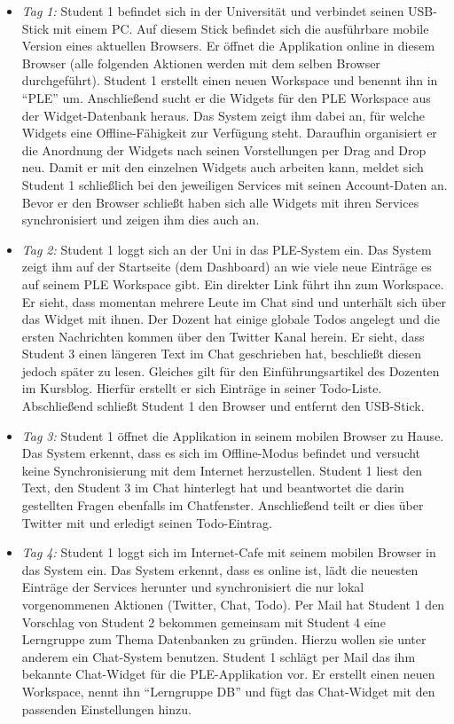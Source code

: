 \begin{itemize}
 \item \emph{Tag 1:} Student 1 befindet sich in der Universität und verbindet seinen USB-Stick mit einem PC. Auf diesem Stick befindet sich die ausführbare mobile Version eines aktuellen Browsers. Er öffnet die Applikation online in diesem Browser (alle folgenden Aktionen werden mit dem selben Browser durchgeführt). Student 1 erstellt einen neuen Workspace und benennt ihn in "`PLE"' um. Anschließend sucht er die Widgets für den PLE Workspace aus der Widget-Datenbank heraus. Das System zeigt ihm dabei an, für welche Widgets eine Offline-Fähigkeit zur Verfügung steht. Daraufhin organisiert er die Anordnung der Widgets nach seinen Vorstellungen per Drag and Drop neu. Damit er mit den einzelnen Widgets auch arbeiten kann, meldet sich Student 1 schließlich bei den jeweiligen Services mit seinen Account-Daten an. Bevor er den Browser schließt haben sich alle Widgets mit ihren Services synchronisiert und zeigen ihm dies auch an.
 \item \emph{Tag 2:} Student 1 loggt sich an der Uni in das PLE-System ein. Das System zeigt ihm auf der Startseite (dem Dashboard) an wie viele neue Einträge es auf seinem PLE Workspace gibt. Ein direkter Link führt ihn zum Workspace. Er sieht, dass momentan mehrere Leute im Chat sind und unterhält sich über das Widget mit ihnen. Der Dozent hat einige globale Todos angelegt und die ersten Nachrichten kommen über den Twitter Kanal herein. Er sieht, dass Student 3 einen längeren Text im Chat geschrieben hat, beschließt diesen jedoch später zu lesen. Gleiches gilt für den Einführungsartikel des Dozenten im Kursblog. Hierfür erstellt er sich Einträge in seiner Todo-Liste. Abschließend schließt Student 1 den Browser und entfernt den USB-Stick.
 \item \emph{Tag 3:} Student 1 öffnet die Applikation in seinem mobilen Browser zu Hause. Das System erkennt, dass es sich im Offline-Modus befindet und versucht keine Synchronisierung mit dem Internet herzustellen. Student 1 liest den Text, den Student 3 im Chat hinterlegt hat und beantwortet die darin gestellten Fragen ebenfalls im Chatfenster. Anschließend teilt er dies über Twitter mit und erledigt seinen Todo-Eintrag.
 \item \emph{Tag 4:} Student 1 loggt sich im Internet-Cafe mit seinem mobilen Browser in das System ein. Das System erkennt, dass es online ist, lädt die neuesten Einträge der Services herunter und synchronisiert die nur lokal vorgenommenen Aktionen (Twitter, Chat, Todo). Per Mail hat Student 1 den Vorschlag von Student 2 bekommen gemeinsam mit Student 4 eine Lerngruppe zum Thema Datenbanken zu gründen. Hierzu wollen sie unter anderem ein Chat-System benutzen. Student 1 schlägt per Mail das ihm bekannte Chat-Widget für die PLE-Applikation vor. Er erstellt einen neuen Workspace, nennt ihn “Lerngruppe DB” und fügt das Chat-Widget mit den passenden Einstellungen hinzu.

\end{itemize}
